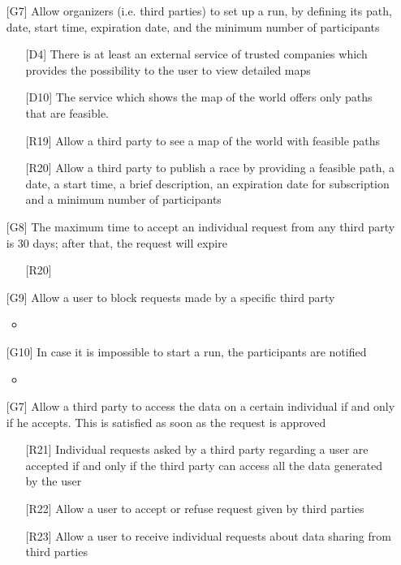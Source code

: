 \begin{itemize}
\begin{itemize}
	\end{itemize}
\item[{[G7]}] Allow organizers (i.e. third parties) to set up a run, by defining its path, date, start time, expiration date, and the minimum number of participants
	\begin{itemize}
	\item[{[D4]}] There is at least an external service of trusted companies which provides the possibility to the user to view detailed maps
	\item[{[D10]}] The service which shows the map of the world offers only paths that are feasible.
	\item[{[R19]}] Allow a third party to see a map of the world with feasible paths
	\item[{[R20]}] Allow a third party to publish a race by providing a feasible path, a date, a start time, a brief description, an expiration date for subscription and a minimum number of participants
	\end{itemize}
\item[{[G8]}] The maximum time to accept an individual request from any third party is 30 days; after that, the request will expire
	\begin{itemize}
	\item[{[R20]}] 
	\end{itemize}
\item[{[G9]}] Allow a user to block requests made by a specific third party
	\begin{itemize}
	\item
	\end{itemize}
\item[{[G10]}] In case it is impossible to start a run, the participants are notified
	\begin{itemize}
	\item 
	\end{itemize}
\item[{[G7]}] Allow a third party to access the data on a certain individual if and only if he accepts. This is satisfied as soon as the request is approved
	\begin{itemize}
	\item[{[R21]}] Individual requests asked by a third party regarding a user are accepted if and only if the third party can access all the data generated by the user
	\item[{[R22]}] Allow a user to accept or refuse request given by third parties
	\item[{[R23]}] Allow a user to receive individual requests about data sharing from third parties

\end{itemize}
\end{itemize}
